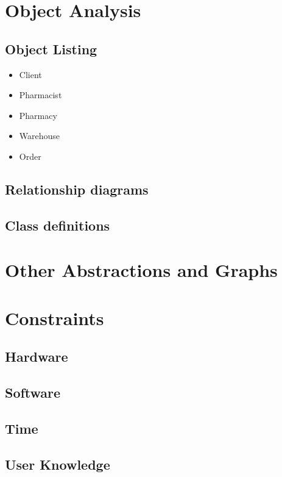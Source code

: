 \section{Object Analysis}

\subsection{Object Listing}
\begin{itemize}

\item Client
\item Pharmacist
\item Pharmacy
\item Warehouse
\item Order

\end{itemize}
\subsection{Relationship diagrams}

\subsection{Class definitions}

\section{Other Abstractions and Graphs}

\section{Constraints}

\subsection{Hardware}

\subsection{Software}

\subsection{Time}

\subsection{User Knowledge}

